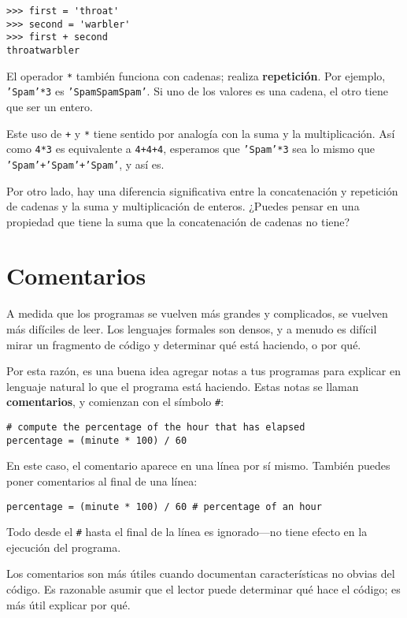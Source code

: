 \begin{lstlisting}
>>> first = 'throat'
>>> second = 'warbler'
>>> first + second
throatwarbler
\end{lstlisting}

El operador \texttt{*} también funciona con cadenas; realiza \textbf{repetición}. 
Por ejemplo, \texttt{'Spam'*3} es \texttt{'SpamSpamSpam'}. Si uno de los valores es una cadena, el otro tiene que ser un entero.

Este uso de \texttt{+} y \texttt{*} tiene sentido por analogía con la suma y la multiplicación. 
Así como \texttt{4*3} es equivalente a \texttt{4+4+4}, esperamos que \texttt{'Spam'*3} sea lo mismo que \texttt{'Spam'+'Spam'+'Spam'}, y así es.

Por otro lado, hay una diferencia significativa entre la concatenación y repetición de cadenas y la suma y multiplicación de enteros. ¿Puedes pensar en una propiedad que tiene la suma que la concatenación de cadenas no tiene?

\section{Comentarios}

A medida que los programas se vuelven más grandes y complicados, se vuelven más difíciles de leer. Los lenguajes formales son densos, y a menudo es difícil mirar un fragmento de código y determinar qué está haciendo, o por qué.

Por esta razón, es una buena idea agregar notas a tus programas para explicar en lenguaje natural lo que el programa está haciendo. Estas notas se llaman \textbf{comentarios}, y comienzan con el símbolo \texttt{\#}:

\begin{lstlisting}
# compute the percentage of the hour that has elapsed
percentage = (minute * 100) / 60
\end{lstlisting}

En este caso, el comentario aparece en una línea por sí mismo. También puedes poner comentarios al final de una línea:

\begin{lstlisting}
percentage = (minute * 100) / 60 # percentage of an hour
\end{lstlisting}

Todo desde el \texttt{\#} hasta el final de la línea es ignorado—no tiene efecto en la ejecución del programa.

Los comentarios son más útiles cuando documentan características no obvias del código. Es razonable asumir que el lector puede determinar qué hace el código; es más útil explicar por qué.

